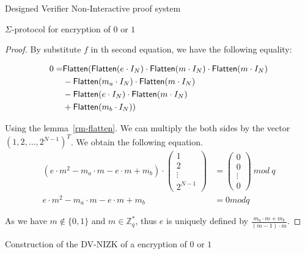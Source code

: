 \begin{section}{Designed Verifier Non-Interactive proof system}
\begin{subsection}{$\Sigma$-protocol for encryption of $0$ or $1$}
\begin{description}
\begin{proof}
          By substitute $f$ in th second equation, we have the following equality:

          \begin{equation}
            \begin{split}
              0 =& {\mathsf{Flatten}}({\mathsf{Flatten}}(e \cdot I_N) \cdot {\mathsf{Flatten}}(m \cdot I_N) \cdot {\mathsf{Flatten}}(m \cdot I_N) \\
              &- {\mathsf{Flatten}}(m_a \cdot I_N) \cdot {\mathsf{Flatten}}(m \cdot I_N) \\
              &- {\mathsf{Flatten}}(e \cdot I_N)\cdot {\mathsf{Flatten}}(m \cdot I_N) \\
              &+ {\mathsf{Flatten}}(m_b \cdot I_N))\\
            \end{split}
          \end{equation}
          
          Using the lemma~\ref{rm-flatten}. We can multiply the both sides by the vector $(1, 2, \dots, 2^{N-1})^T$. We obtain the following equation.
          \begin{align*}
            (e\cdot m^2 - m_a \cdot m - e \cdot m + m_b) \cdot \left( \begin{smallmatrix} 1\\ 2\\ \vdots \\ 2^{N-1} \end{smallmatrix}\right) &= \left( \begin{smallmatrix} 0\\ 0\\ \vdots \\ 0 \end{smallmatrix}\right)~mod~q\\
            e \cdot m^2 - m_a \cdot m - e \cdot m + m_b &= 0 mod q
          \end{align*}
          

          As we have $m \not \in \{0,1\}$ and $m \in \mathbb{Z}_q^*$, thus $e$ is uniquely defined by $\frac{m_a \cdot m + m_b}{(m -1 ) \cdot m}$. 
        \end{proof}
        
        
    \end{description}


  \end{subsection}

  \begin{subsection}{Construction of the DV-NIZK of a encryption of $0$ or $1$}
    \begin{description}


\end{description}
\end{subsection}
\end{section}
